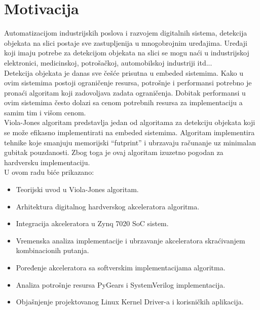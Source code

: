 \section{Motivacija}

Automatizacijom industrijskih poslova i razvojem digitalnih sistema, detekcija objekata na
slici postaje sve zastupljenija u mnogobrojnim uređajima.
Uređaji koji imaju potrebe za detekcijom objekata na slici se mogu naći u
industrijskoj elektronici, medicinskoj, potrošačkoj, automobilskoj industriji
itd... \\

Detekcija objekata je danas sve češće prisutna u embeded sistemima.
Kako u ovim sistemima postoji ograničenje resursa, potrošnje i performansi
potrebno je pronaći algoritam koji zadovoljava zadata ograničenja.
Dobitak performansi u ovim sistemima često dolazi sa cenom potrebnih resursa za
implementaciju a samim tim i višom cenom. \\

Viola-Jones algoritam predstavlja jedan od algoritama za detekciju objekata koji
se može efikasno implementirati na embeded sistemima.
Algoritam implementira tehnike koje smanjuju memorijski ``futprint'' i ubrzavaju
računanje uz minimalan gubitak pouzdanosti.
Zbog toga je ovaj algoritam izuzetno pogodan za hardversku implementaciju. \\

\noindent
U ovom radu biće prikazano:
\begin{itemize}
\item Teorijski uvod u Viola-Jones algoritam.
\item Arhitektura digitalnog hardverskog akceleratora algoritma.
\item Integracija akceleratora u Zynq 7020 SoC sistem.
\item Vremenska analiza implementacije i ubrzavanje akceleratora skraćivanjem kombinacionih
  putanja.
\item Poređenje akceleratora sa softverskim implementacijama algoritma.
\item Analiza potrošnje resursa PyGears i SystemVerilog implementacija.
\item Objašnjenje projektovanog Linux Kernel Driver-a i korisničkih aplikacija.
\end{itemize}